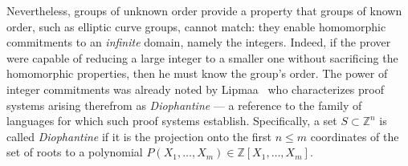 Nevertheless, groups of unknown order provide a property that groups of known order, such as elliptic curve groups, cannot match: they enable homomorphic  commitments to an \emph{infinite} domain, namely the integers. Indeed, if the prover were capable of reducing a large integer to a smaller one without sacrificing the homomorphic properties, then he must know the group's order. The power of integer commitments was already noted by Lipmaa~\cite{AC:Lipmaa03b} who characterizes proof systems arising therefrom as \emph{Diophantine} --- a reference to the family of languages for which such proof systems establish. Specifically, a set $S \subset \mathbb{Z}^n$ is called \emph{Diophantine} if it is the projection onto the first $n \leq m$ coordinates of the set of roots to a polynomial $P(X_1, \ldots, X_m) \in \mathbb{Z}[X_1, \ldots, X_m]$.%


